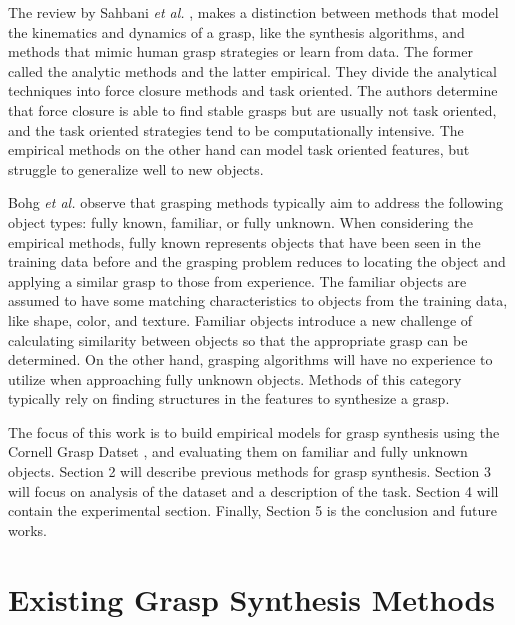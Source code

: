 \documentclass{article}
\begin{document}
The review by Sahbani \textit{et al.} \cite{sahbani12}, makes a distinction
between methods that model the kinematics and dynamics of a grasp, like the
synthesis algorithms, and methods that mimic human grasp strategies or learn
from data. The former called the analytic methods and the latter empirical.
They divide the analytical techniques into force closure methods and task
oriented. The authors determine that force closure is able to find stable
grasps but are usually not task oriented, and the task oriented strategies tend
to be computationally intensive. The empirical methods on the other hand can
model task oriented features, but struggle to generalize well to new objects.

Bohg \textit{et al.} \cite{bohg14} observe that grasping methods typically aim
to address the following object types: fully known, familiar, or fully unknown.
When considering the empirical methods, fully known represents objects that
have been seen in the training data before and the grasping problem reduces to
locating the object and applying a similar grasp to those from experience.
The familiar objects are assumed to have some matching characteristics to objects
from the training data, like shape, color, and texture. Familiar objects
introduce a new challenge of calculating similarity between objects so that
the appropriate grasp can be determined. On the other hand, grasping algorithms
will have no experience to utilize when approaching fully unknown objects. Methods
of this category typically rely on finding structures in the features to
synthesize a grasp.

The focus of this work is to build empirical models for grasp synthesis using
the Cornell Grasp Datset \cite{lenz15}, and evaluating them on familiar and
fully unknown objects. Section 2 will describe previous methods for grasp
synthesis. Section 3 will focus on analysis of the dataset and a description
of the task. Section 4 will contain the experimental section. Finally, Section
5 is the conclusion and future works.

\section{Existing Grasp Synthesis Methods}
\end{document}
